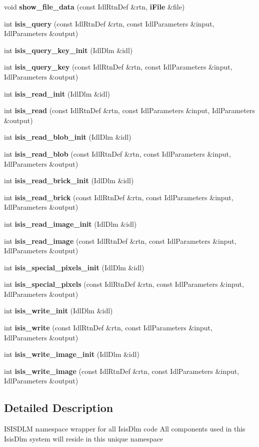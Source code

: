 \begin{CompactItemize}
void {\bf show\_\-file\_\-data} (const Idl\-Rtn\-Def \&rtn, {\bf i\-File} \&file)
\item 
int {\bf isis\_\-query} (const Idl\-Rtn\-Def \&rtn, const Idl\-Parameters \&input, Idl\-Parameters \&output)
\item 
int {\bf isis\_\-query\_\-key\_\-init} (Idl\-Dlm \&idl)
\item 
int {\bf isis\_\-query\_\-key} (const Idl\-Rtn\-Def \&rtn, const Idl\-Parameters \&input, Idl\-Parameters \&output)
\item 
int {\bf isis\_\-read\_\-init} (Idl\-Dlm \&idl)
\item 
int {\bf isis\_\-read} (const Idl\-Rtn\-Def \&rtn, const Idl\-Parameters \&input, Idl\-Parameters \&output)
\item 
int {\bf isis\_\-read\_\-blob\_\-init} (Idl\-Dlm \&idl)
\item 
int {\bf isis\_\-read\_\-blob} (const Idl\-Rtn\-Def \&rtn, const Idl\-Parameters \&input, Idl\-Parameters \&output)
\item 
int {\bf isis\_\-read\_\-brick\_\-init} (Idl\-Dlm \&idl)
\item 
int {\bf isis\_\-read\_\-brick} (const Idl\-Rtn\-Def \&rtn, const Idl\-Parameters \&input, Idl\-Parameters \&output)
\item 
int {\bf isis\_\-read\_\-image\_\-init} (Idl\-Dlm \&idl)
\item 
int {\bf isis\_\-read\_\-image} (const Idl\-Rtn\-Def \&rtn, const Idl\-Parameters \&input, Idl\-Parameters \&output)
\item 
int {\bf isis\_\-special\_\-pixels\_\-init} (Idl\-Dlm \&idl)
\item 
int {\bf isis\_\-special\_\-pixels} (const Idl\-Rtn\-Def \&rtn, const Idl\-Parameters \&input, Idl\-Parameters \&output)
\item 
int {\bf isis\_\-write\_\-init} (Idl\-Dlm \&idl)
\item 
int {\bf isis\_\-write} (const Idl\-Rtn\-Def \&rtn, const Idl\-Parameters \&input, Idl\-Parameters \&output)
\item 
int {\bf isis\_\-write\_\-image\_\-init} (Idl\-Dlm \&idl)
\item 
int {\bf isis\_\-write\_\-image} (const Idl\-Rtn\-Def \&rtn, const Idl\-Parameters \&input, Idl\-Parameters \&output)
\end{CompactItemize}


\subsection{Detailed Description}
ISISDLM namespace wrapper for all Isis\-Dlm code All components used in this Isis\-Dlm system will reside in this unique namespace 




